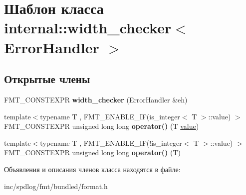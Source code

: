 \hypertarget{classinternal_1_1width__checker}{}\section{Шаблон класса internal\+:\+:width\+\_\+checker$<$ Error\+Handler $>$}
\label{classinternal_1_1width__checker}
\subsection*{Открытые члены}
\begin{DoxyCompactItemize}
\item 
\mbox{\label{classinternal_1_1width__checker_a499700f9c61e326c4494fa47d53fb659}} 
F\+M\+T\+\_\+\+C\+O\+N\+S\+T\+E\+X\+PR {\bfseries width\+\_\+checker} (Error\+Handler \&eh)
\item 
\mbox{\label{classinternal_1_1width__checker_aa2e87a8e642d2fbba09fd98cfc286ef6}} 
{\footnotesize template$<$typename T , F\+M\+T\+\_\+\+E\+N\+A\+B\+L\+E\+\_\+\+I\+F(is\+\_\+integer$<$ T $>$\+::value) $>$ }\\F\+M\+T\+\_\+\+C\+O\+N\+S\+T\+E\+X\+PR unsigned long long {\bfseries operator()} (T \hyperlink{classinternal_1_1value}{value})
\item 
\mbox{\label{classinternal_1_1width__checker_aed6b152beaf7ac5daac5e9b940cc1e5f}} 
{\footnotesize template$<$typename T , F\+M\+T\+\_\+\+E\+N\+A\+B\+L\+E\+\_\+\+I\+F(!is\+\_\+integer$<$ T $>$\+::value) $>$ }\\F\+M\+T\+\_\+\+C\+O\+N\+S\+T\+E\+X\+PR unsigned long long {\bfseries operator()} (T)
\end{DoxyCompactItemize}


Объявления и описания членов класса находятся в файле\+:\begin{DoxyCompactItemize}
\item 
inc/spdlog/fmt/bundled/format.\+h\end{DoxyCompactItemize}
